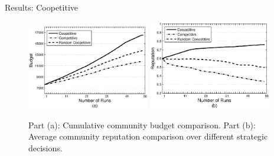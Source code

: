 \documentclass{beamer}
\begin{document}
\begin{frame}{Results: Coopetitive}
    \begin{figure}%
        \includegraphics[width=2.1in]{figures/graphbgtmed.eps}
        \includegraphics[width=2.1in]{figures/graphrep.eps}
        \caption{Part (a): Cumulative community budget comparison. Part
        (b): Average community reputation comparison over different
        strategic decisions.} \label{Graph1}
    \end{figure}
\end{frame}
\end{document}
